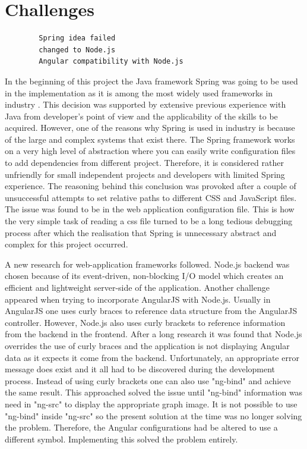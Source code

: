 \documentclass{l4proj}
\begin{document}
\section{Challenges}
\begin{verbatim}
		Spring idea failed
		changed to Node.js
		Angular compatibility with Node.js
\end{verbatim}

In the beginning of this project the Java framework Spring was going to be used in the implementation as it is among the most widely used frameworks in industry \cite{shiLuiLi}. This decision was supported by extensive previous experience with Java from developer's point of view and the applicability of the skills to be acquired. However, one of the reasons why Spring is used in industry is because of the large and complex systems that exist there. The Spring framework works on a very high level of abstraction where you can easily write configuration files to add dependencies from different project. Therefore, it is considered rather unfriendly for small independent projects and developers with limited Spring experience. The reasoning behind this conclusion was provoked after a couple of unsuccessful attempts to set relative paths to different CSS and JavaScript files. The issue was found to be in the web application configuration file. This is how the very simple task of reading a css file turned to be a long tedious debugging process after which the realisation that Spring is unnecessary abstract and complex for this project occurred.

A new research for web-application frameworks followed. Node.js backend was chosen because of its event-driven, non-blocking I/O model which creates an efficient and lightweight server-side of the application. Another challenge appeared when trying to incorporate AngularJS with Node.js. Usually in AngularJS one uses curly braces to reference data structure from the AngularJS controller. However, Node.js also uses curly brackets to reference information from the backend in the frontend. After a long research  it was found that Node.js overrides the use of curly braces and the application is not displaying Angular data as it expects it come from the backend. Unfortunately, an appropriate error message does exist and it all had to be discovered during the development process. Instead of using curly brackets one can also use "ng-bind" and achieve the same result. This approached solved the issue until "ng-bind" information was need in "ng-src" to display the appropriate graph image. It is not possible to use "ng-bind" inside "ng-src" so the present solution at the time was no longer solving the problem. Therefore, the Angular configurations had be altered to use a different symbol. Implementing this solved the problem entirely. 
\end{document}
